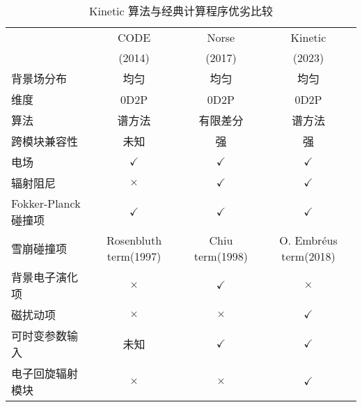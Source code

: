 \begin{table*}[h]
  \centering

\caption{\label{table:CompCode}Kinetic 算法与经典计算程序优劣比较}
\begin{tabular}{lccc}
  \hline
 \multirow{2}{*}{} & CODE\cite{RN814}&Norse\cite{RN1894} &Kinetic \\
  & (2014) & (2017)& (2023)\\
  \hline
  背景场分布 & 均匀 & 均匀 & 均匀\\
  \hline
 维度 & 0D2P & 0D2P &0D2P\\
 \hline
 算法 & 谱方法 & 有限差分 &谱方法\\
 \hline
 跨模块兼容性 & 未知 & 强 &强\\
 \hline
电场 & $\checkmark$ & $\checkmark$ &$\checkmark$\\
辐射阻尼& $\times$ & $\checkmark$ &$\checkmark$\\
Fokker-Planck碰撞项&  $\checkmark$ & $\checkmark$ &$\checkmark$\\
雪崩碰撞项& Rosenbluth term\cite{RN1793}(1997)& Chiu term\cite{RN1941}(1998) &O. Embréus term\cite{RN1811}(2018)\\
背景电子演化项& $\times$ &$\checkmark$ &$\times$\\
磁扰动项&$\times$ & $\times$&$\checkmark$\\
\hline
可时变参数输入&未知& $\checkmark$&$\checkmark$\\
\hline
电子回旋辐射模块&$\times$& $\times$&$\checkmark$ \\
\hline
\end{tabular}
\end{table*}


